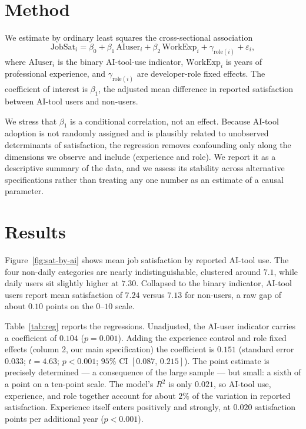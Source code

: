 \documentclass[11pt]{article}
\begin{document}
\section{Method}
We estimate by ordinary least squares the cross-sectional association
\begin{equation*}
\text{JobSat}_i = \beta_0 + \beta_1\,\text{AIuser}_i
+ \beta_2\,\text{WorkExp}_i + \gamma_{\text{role}(i)} + \varepsilon_i,
\end{equation*}
where $\text{AIuser}_i$ is the binary AI-tool-use indicator,
$\text{WorkExp}_i$ is years of professional experience, and
$\gamma_{\text{role}(i)}$ are developer-role fixed effects. The coefficient
of interest is $\beta_1$, the adjusted mean difference in reported
satisfaction between AI-tool users and non-users.

We stress that $\beta_1$ is a conditional correlation, not an effect.
Because AI-tool adoption is not randomly assigned and is plausibly related
to unobserved determinants of satisfaction, the regression removes
confounding only along the dimensions we observe and include (experience
and role). We report it as a descriptive summary of the data, and we assess
its stability across alternative specifications rather than treating any one
number as an estimate of a causal parameter.

\section{Results}
Figure~\ref{fig:sat-by-ai} shows mean job satisfaction by reported AI-tool
use. The four non-daily categories are nearly indistinguishable, clustered
around $7.1$, while daily users sit slightly higher at $7.30$. Collapsed to
the binary indicator, AI-tool users report mean satisfaction of $7.24$
versus $7.13$ for non-users, a raw gap of about $0.10$ points on the
$0$--$10$ scale.

Table~\ref{tab:reg} reports the regressions. Unadjusted, the AI-user
indicator carries a coefficient of $0.104$ ($p = 0.001$). Adding the
experience control and role fixed effects (column 2, our main
specification) the coefficient is $0.151$ (standard error $0.033$;
$t = 4.63$; $p < 0.001$; $95\%$ CI $[0.087,\,0.215]$). The point estimate
is precisely determined --- a consequence of the large sample --- but
small: a sixth of a point on a ten-point scale. The model's $R^2$ is only
$0.021$, so AI-tool use, experience, and role together account for about
$2\%$ of the variation in reported satisfaction. Experience itself enters
positively and strongly, at $0.020$ satisfaction points per additional year
($p < 0.001$).
\end{document}

